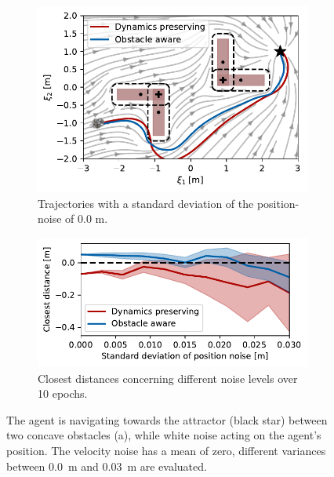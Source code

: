 \begin{figure}
    \centering
    \begin{subfigure}{\columnwidth}
      \centerline{\includegraphics[width=\textwidth]{figures/trajectory_position_noise}}
      \caption{Trajectories with a standard deviation of the position-noise of 0.0 m.}
      \label{fig:trajectory_position_noise}
    \end{subfigure}
    \begin{subfigure}{\columnwidth}
    \includegraphics[width=\textwidth]{figures/comparison_position_noise}
      \caption{Closest distances concerning different noise levels over 10 epochs.}
      \label{fig:comparison_position_noise}
    \end{subfigure}
	\caption{The agent is navigating towards the attractor (black star) between two concave obstacles (a), while white noise acting on the agent's position. The velocity noise has a mean of zero, different variances between \qty{0.0}{m} and \qty{0.03}{m} are evaluated.}
\label{fig:position_noise}
\end{figure}


